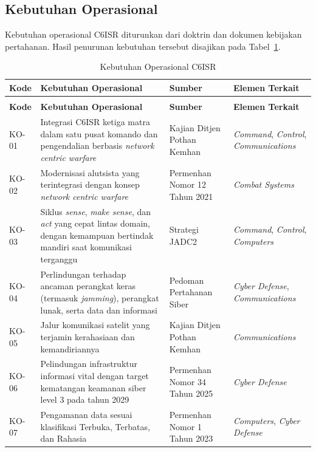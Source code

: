 \subsection{Kebutuhan Operasional}

Kebutuhan operasional C6ISR diturunkan dari doktrin dan dokumen kebijakan pertahanan. Hasil penurunan kebutuhan tersebut disajikan pada Tabel~\ref{tab:d4-27}.

{\small
\begin{longtable}{@{}>{\raggedright\arraybackslash}p{}>{\raggedright\arraybackslash}p{}>{\raggedright\arraybackslash}p{}>{\raggedright\arraybackslash}p{}@{}}
\caption{Kebutuhan Operasional C6ISR}
\label{tab:d4-27}\\
\toprule
\textbf{Kode} & \textbf{Kebutuhan Operasional} & \textbf{Sumber} & \textbf{Elemen Terkait}\\
\midrule
\endfirsthead
\multicolumn{4}{@{}l}{\small\itshape \tablename\ \thetable{} (lanjutan)}\\
\toprule
\textbf{Kode} & \textbf{Kebutuhan Operasional} & \textbf{Sumber} & \textbf{Elemen Terkait}\\
\midrule
\endhead
\bottomrule
\endlastfoot
KO-01 & Integrasi C6ISR ketiga matra dalam satu pusat komando dan pengendalian berbasis \textit{network centric warfare} & Kajian Ditjen Pothan Kemhan \parencite{Dwipratama2023} & \textit{Command}, \textit{Control}, \textit{Communications}\\
KO-02 & Modernisasi alutsista yang terintegrasi dengan konsep \textit{network centric warfare} & Permenhan Nomor 12 Tahun 2021 \parencite{Permenhan12Tahun2021} & \textit{Combat Systems}\\
KO-03 & Siklus \textit{sense}, \textit{make sense}, dan \textit{act} yang cepat lintas domain, dengan kemampuan bertindak mandiri saat komunikasi terganggu & Strategi JADC2 \parencite{USDoD2022} & \textit{Command}, \textit{Control}, \textit{Computers}\\
KO-04 & Perlindungan terhadap ancaman perangkat keras (termasuk \textit{jamming}), perangkat lunak, serta data dan informasi & Pedoman Pertahanan Siber \parencite{KemhanRI2014} & \textit{Cyber Defense}, \textit{Communications}\\
KO-05 & Jalur komunikasi satelit yang terjamin kerahasiaan dan kemandiriannya & Kajian Ditjen Pothan Kemhan \parencite{Dwipratama2023} & \textit{Communications}\\
KO-06 & Pelindungan infrastruktur informasi vital dengan target kematangan keamanan siber level 3 pada tahun 2029 & Permenhan Nomor 34 Tahun 2025 \parencite{Permenhan34Tahun2025} & \textit{Cyber Defense}\\
KO-07 & Pengamanan data sesuai klasifikasi Terbuka, Terbatas, dan Rahasia & Permenhan Nomor 1 Tahun 2023 \parencite{Permenhan1Tahun2023} & \textit{Computers}, \textit{Cyber Defense}\\
\end{longtable}
}

